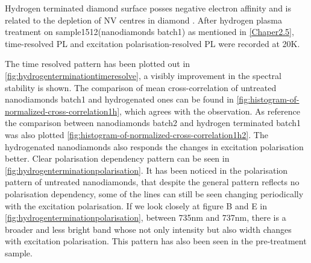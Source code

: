 Hydrogen terminated diamond surface posses negative electron affinity \citep{maier_electron_2001,ristein_electronic_2000,diederich_electron_1998} and is related to the depletion of NV centres in diamond \cite{stacey_depletion_2012}. After hydrogen plasma treatment on sample1512(nanodiamonds batch1) as mentioned in \ref{Chaper2.5}, time-resolved PL and excitation polarisation-resolved PL were recorded at 20K.

The time resolved pattern has been plotted out in \ref{fig:hydrogenterminationtimeresolve}, a visibly improvement in the spectral stability is shown. The comparison of mean cross-correlation of untreated nanodiamonds batch1 and hydrogenated ones can be found in \ref{fig:histogram-of-normalized-cross-correlation1h}, which agrees with the observation. As reference the comparison between nanodiamonds batch2 and hydrogen terminated batch1 was also plotted \ref{fig:histogram-of-normalized-cross-correlation1h2}. The hydrogenated nanodiamonds also responds the changes in excitation polarisation better. Clear polarisation dependency pattern can be seen in \ref{fig:hydrogenterminationpolarisation}. It has been noticed in the polarisation pattern of untreated nanodiamonds, that despite the general pattern reflects no polarisation dependency, some of the lines can still be seen changing periodically with the excitation polarisation. If we look closely at figure B and E in \ref{fig:hydrogenterminationpolarisation}, between 735nm and 737nm, there is a broader and less bright band whose not only intensity but also width changes with excitation polarisation. This pattern has also been seen in the pre-treatment sample.

 

